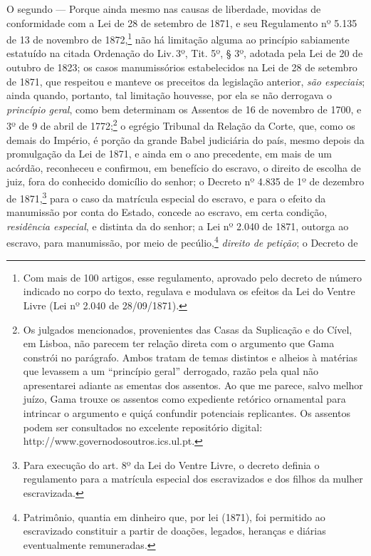 O segundo --- Porque ainda mesmo nas causas de liberdade, movidas de
conformidade com a Lei de 28 de setembro de 1871, e seu Regulamento nº
5.135 de 13 de novembro de 1872,\footnote{Com mais de 100 artigos, esse
  regulamento, aprovado pelo decreto de número indicado no corpo do
  texto, regulava e modulava os efeitos da Lei do Ventre Livre (Lei nº
  2.040 de 28/09/1871).} não há limitação alguma ao princípio
sabiamente estatuído na citada Ordenação do Liv.\,3º, Tit. 5º, § 3º,
adotada pela Lei de 20 de outubro de 1823; os casos manumissórios
estabelecidos na Lei de 28 de setembro de 1871, que respeitou e manteve
os preceitos da legislação anterior, \emph{são especiais}; ainda quando,
portanto, tal limitação houvesse, por ela se não derrogava o
\emph{princípio geral}, como bem determinam os Assentos de 16 de
novembro de 1700, e 3º de 9 de abril de 1772;\footnote{Os julgados
  mencionados, provenientes das Casas da Suplicação e do Cível, em
  Lisboa, não parecem ter relação direta com o argumento que Gama
  constrói no parágrafo. Ambos tratam de temas distintos e alheios à
  matérias que levassem a um ``princípio geral'' derrogado, razão pela qual
  não apresentarei adiante as ementas dos assentos. Ao que me parece,
  salvo melhor juízo, Gama trouxe os assentos como expediente retórico
  ornamental para intrincar o argumento e quiçá confundir potenciais
  replicantes. Os assentos podem ser consultados no excelente
  repositório digital: http://www.governodosoutros.ics.ul.pt.} o
egrégio Tribunal da Relação da Corte, que, como os demais do Império, é
porção da grande Babel judiciária do país, mesmo depois da promulgação
da Lei de 1871, e ainda em o ano precedente, em mais de um acórdão,
reconheceu e confirmou, em benefício do escravo, o direito de escolha de
juiz, fora do conhecido domicílio do senhor; o Decreto nº 4.835 de 1º de
dezembro de 1871,\footnote{Para execução do art. 8º da Lei do Ventre
  Livre, o decreto definia o regulamento para a matrícula especial dos
  escravizados e dos filhos da mulher escravizada.} para o caso da
matrícula especial do escravo, e para o efeito da manumissão por conta
do Estado, concede ao escravo, em certa condição, \emph{residência
especial}, e distinta da do senhor; a Lei nº 2.040 de 1871, outorga ao
escravo, para manumissão, por meio de pecúlio,\footnote{Patrimônio,
  quantia em dinheiro que, por lei (1871), foi permitido ao escravizado
  constituir a partir de doações, legados, heranças e diárias
  eventualmente remuneradas.} \emph{direito de petição}; o Decreto de

